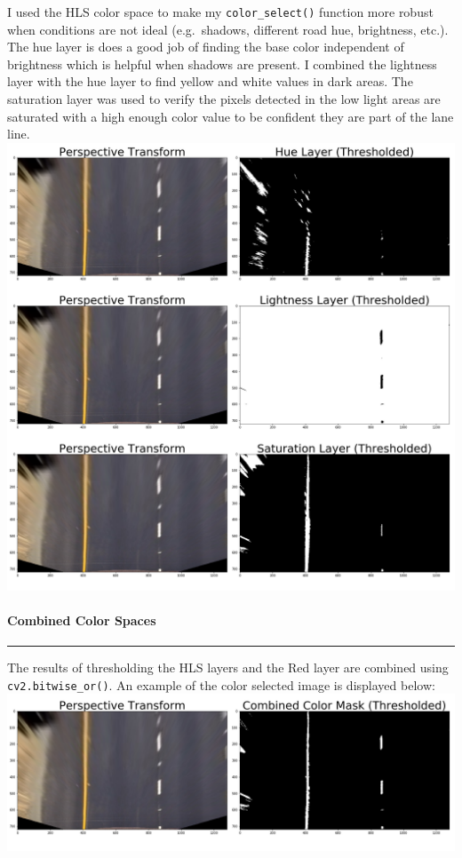 \documentclass[11pt]{article}
\makeatletter
\def\maxwidth{\ifdim\Gin@nat@width>\linewidth\linewidth
    \else\Gin@nat@width\fi}
\let\Oldincludegraphics\includegraphics
\renewcommand{\includegraphics}[1]{\Oldincludegraphics[width=.8\maxwidth]{#1}}
\makeatother
\begin{document}
I used the HLS color space to make my \texttt{color\_select()} function
more robust when conditions are not ideal (e.g.~shadows, different road
hue, brightness, etc.). The hue layer is does a good job of finding the
base color independent of brightness which is helpful when shadows are
present. I combined the lightness layer with the hue layer to find
yellow and white values in dark areas. The saturation layer was used to
verify the pixels detected in the low light areas are saturated with a
high enough color value to be confident they are part of the lane line.
\includegraphics{./output_images/writeup_images/straight_lines1_hls.png}

\hypertarget{combined-color-spaces}{%
\paragraph{Combined Color Spaces}\label{combined-color-spaces}}

\begin{center}\rule{0.5\linewidth}{\linethickness}\end{center}

The results of thresholding the HLS layers and the Red layer are
combined using \texttt{cv2.bitwise\_or()}. An example of the color
selected image is displayed below:\\
\includegraphics{./output_images/writeup_images/straight_lines1_combined.png}
\end{document}
